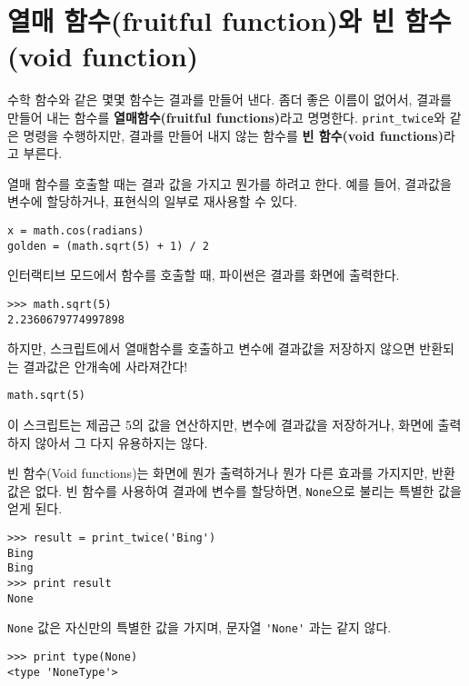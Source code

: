 \section{열매 함수(fruitful function)와 빈 함수(void function)}


수학 함수와 같은 몇몇 함수는 결과를 만들어 낸다. 좀더 좋은 이름이 없어서, 결과를 만들어 내는 함수를 {\bf 열매함수(fruitful functions)}라고 명명한다.
\verb"print_twice"와 같은 명령을 수행하지만, 결과를 만들어 내지 않는 함수를 {\bf 빈 함수(void functions)}라고 부른다.

열매 함수를 호출할 때는 결과 값을 가지고 뭔가를 하려고 한다. 예를 들어, 결과값을 변수에 할당하거나, 표현식의 일부로 재사용할 수 있다.

\beforeverb
\begin{verbatim}
x = math.cos(radians)
golden = (math.sqrt(5) + 1) / 2
\end{verbatim}
\afterverb
%
인터랙티브 모드에서 함수를 호출할 때, 파이썬은 결과를 화면에 출력한다.

\beforeverb
\begin{verbatim}
>>> math.sqrt(5)
2.2360679774997898
\end{verbatim}
\afterverb
%
하지만, 스크립트에서 열매함수를 호출하고 변수에 결과값을 저장하지 않으면 반환되는 결과값은 안개속에 사라져간다!

\beforeverb
\begin{verbatim}
math.sqrt(5)
\end{verbatim}
\afterverb
%
이 스크립트는 제곱근 5의 값을 연산하지만, 변수에 결과값을 저장하거나, 화면에 출력하지 않아서 그 다지 유용하지는 않다.


빈 함수(Void functions)는 화면에 뭔가 출력하거나 뭔가 다른 효과를 가지지만, 반환값은 없다.
빈 함수를 사용하여 결과에 변수를 할당하면, {\tt None}으로 불리는 특별한 값을 얻게 된다.


\beforeverb
\begin{verbatim}
>>> result = print_twice('Bing')
Bing
Bing
>>> print result
None
\end{verbatim}
\afterverb
%

{\tt None} 값은 자신만의 특별한 값을 가지며, 문자열 \verb"'None'" 과는 같지 않다. 

\beforeverb
\begin{verbatim}
>>> print type(None)
<type 'NoneType'>
\end{verbatim}
\afterverb
%

